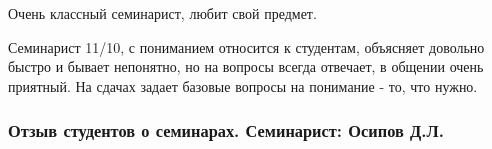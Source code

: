         \begin{commentbox} 
            Очень классный семинарист, любит свой предмет. 
        \end{commentbox} 
    
        \begin{commentbox} 
            Семинарист 11/10, с пониманием относится к студентам, объясняет довольно быстро и бывает непонятно, но на вопросы всегда отвечает, в общении очень приятный. На сдачах задает базовые вопросы на понимание - то, что нужно. 
        \end{commentbox} 
    

    \subsubsection{Отзыв студентов о семинарах. Семинарист: Осипов Д.Л.}
